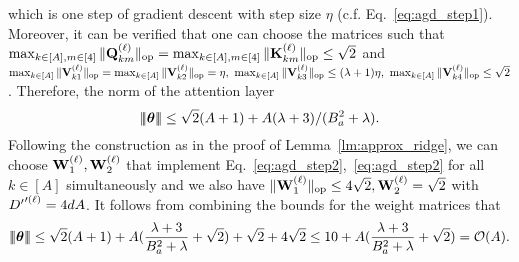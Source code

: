 which is one step of gradient descent with step size $\eta$ (c.f.   Eq.~\ref{eq:agd_step1}).  Moreover, it can be verified that one can choose the matrices such that $\max_{k\in[A],m\in[4]}\|{{\mathbf Q}_{km}^{(\ell)}}\|_{\mathrm{op}}=\max_{k\in[A],m\in[4]}\|{{\mathbf K}^{(\ell)}_{km}}\|_{\mathrm{op}}\leq\sqrt{2}$ and $\max_{k\in[A]}\|{{\mathbf V}^{(\ell)}_{k1}}\|_{\mathrm{op}}=\max_{k\in[A]}\|{{\mathbf V}^{(\ell)}_{k2}}\|_{\mathrm{op}}=\eta,~\max_{k\in[A]}\|{{\mathbf V}^{(\ell)}_{k3}}\|_{\mathrm{op}}\leq (\lambda+1)\eta,~\max_{k\in[A]}\|{{\mathbf V}^{(\ell)}_{k4}}\|_{\mathrm{op}}\leq \sqrt{2}$. Therefore, the norm of the attention layer $${\left|\!\left|\!\left|{{\boldsymbol \theta}}\right|\!\right|\!\right|}\leq \sqrt{2}(A+1)+A(\lambda+3)/(B_a^2+\lambda).$$ Following the construction as in the proof of Lemma~\ref{lm:approx_ridge}, we can choose ${\mathbf W}_1^{(\ell)},{\mathbf W}_2^{(\ell)}$ that implement Eq.~\eqref{eq:agd_step2},~\eqref{eq:agd_step2} for all $k\in[A]$ simultaneously and we also have $\|{{\mathbf W}_1^{(\ell)}}\|_{\mathrm{op}}\leq4\sqrt{2},{\mathbf W}_2^{(\ell)}=\sqrt{2}$ with ${D'}'^{{(\ell)}}=4dA$. It follows from  combining the bounds for the weight matrices that 
$$
{\left|\!\left|\!\left|{{\boldsymbol \theta}}\right|\!\right|\!\right|}\leq \sqrt{2}(A+1)+A(\frac{\lambda+3}{B_a^2+\lambda}+\sqrt{2})+\sqrt{2}+4\sqrt{2}\leq 10+A(\frac{\lambda+3}{B_a^2+\lambda}+\sqrt{2})=\mathcal{O}(A).$$

